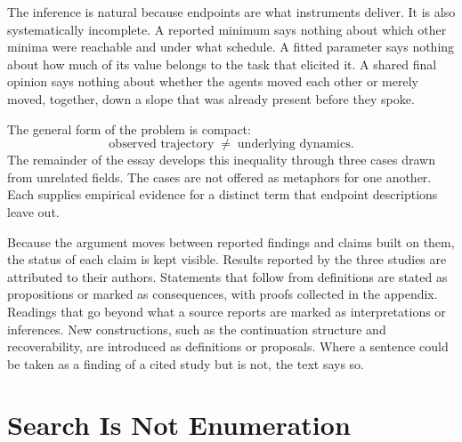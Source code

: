 \documentclass[11pt]{article}
\theoremstyle{definition}
\theoremstyle{remark}
\begin{document}
The inference is natural because endpoints are what instruments deliver. It is also systematically incomplete. A reported minimum says nothing about which other minima were reachable and under what schedule. A fitted parameter says nothing about how much of its value belongs to the task that elicited it. A shared final opinion says nothing about whether the agents moved each other or merely moved, together, down a slope that was already present before they spoke.

The general form of the problem is compact:
\begin{equation}
\text{observed trajectory} \;\neq\; \text{underlying dynamics}.
\end{equation}
The remainder of the essay develops this inequality through three cases drawn from unrelated fields. The cases are not offered as metaphors for one another. Each supplies empirical evidence for a distinct term that endpoint descriptions leave out.

Because the argument moves between reported findings and claims built on them, the status of each claim is kept visible. Results reported by the three studies are attributed to their authors. Statements that follow from definitions are stated as propositions or marked as consequences, with proofs collected in the appendix. Readings that go beyond what a source reports are marked as interpretations or inferences. New constructions, such as the continuation structure and recoverability, are introduced as definitions or proposals. Where a sentence could be taken as a finding of a cited study but is not, the text says so.

\section{Search Is Not Enumeration}
\end{document}
